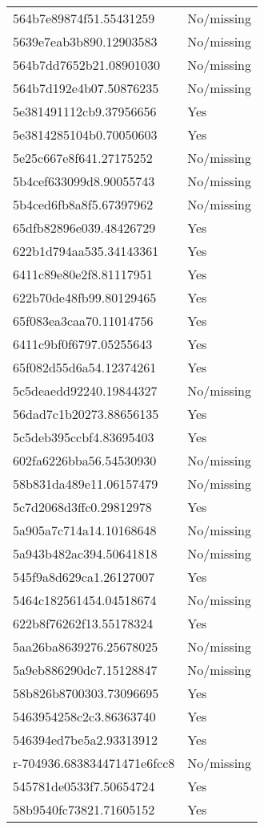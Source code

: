 \begin{tabular}{ll}
564b7e89874f51.55431259 & No/missing \\
5639e7eab3b890.12903583 & No/missing \\
564b7dd7652b21.08901030 & No/missing \\
564b7d192e4b07.50876235 & No/missing \\
5e381491112cb9.37956656 & Yes \\
5e3814285104b0.70050603 & Yes \\
5e25c667e8f641.27175252 & No/missing \\
5b4cef633099d8.90055743 & No/missing \\
5b4ced6fb8a8f5.67397962 & No/missing \\
65dfb82896e039.48426729 & Yes \\
622b1d794aa535.34143361 & Yes \\
6411c89e80e2f8.81117951 & Yes \\
622b70de48fb99.80129465 & Yes \\
65f083ea3caa70.11014756 & Yes \\
6411c9bf0f6797.05255643 & Yes \\
65f082d55d6a54.12374261 & Yes \\
5c5deaedd92240.19844327 & No/missing \\
56dad7c1b20273.88656135 & Yes \\
5c5deb395ccbf4.83695403 & Yes \\
602fa6226bba56.54530930 & No/missing \\
58b831da489e11.06157479 & No/missing \\
5c7d2068d3ffc0.29812978 & Yes \\
5a905a7c714a14.10168648 & No/missing \\
5a943b482ac394.50641818 & No/missing \\
545f9a8d629ca1.26127007 & Yes \\
5464c182561454.04518674 & No/missing \\
622b8f76262f13.55178324 & Yes \\
5aa26ba8639276.25678025 & No/missing \\
5a9eb886290dc7.15128847 & No/missing \\
58b826b8700303.73096695 & Yes \\
5463954258c2c3.86363740 & Yes \\
546394ed7be5a2.93313912 & Yes \\
r-704936.683834471471e6fcc8 & No/missing \\
545781de0533f7.50654724 & Yes \\
58b9540fc73821.71605152 & Yes \\

\end{tabular}
